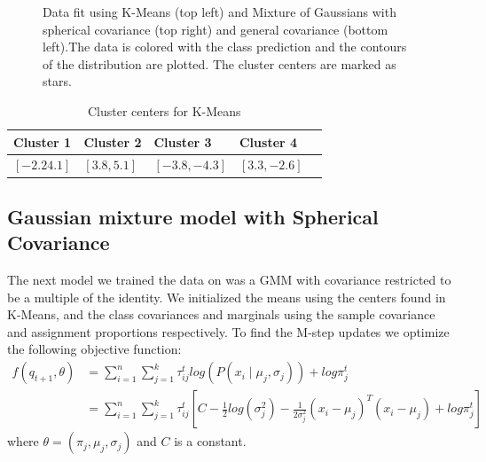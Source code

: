 \documentclass[paper=a4, fontsize=11pt]{scrartcl} %
\numberwithin{equation}{section} %
\numberwithin{figure}{section} %
\numberwithin{table}{section} %
\begin{document}
\begin{figure}
\begin{subfigure}{.5\textwidth}
	\end{subfigure}
	\caption{Data fit using K-Means (top left) and Mixture of Gaussians with spherical covariance (top right) and general covariance (bottom left).The data is colored with the class prediction and the contours of the distribution are plotted. The cluster centers are marked as stars.}
\end{figure}

	\begin{table}
		\caption {Cluster centers for K-Means} \label{tab:title} 
		\begin{center}		
			\begin{tabular}{*5l}   
				\toprule
				Cluster 1 & Cluster 2 & Cluster 3 & Cluster 4
				\\\midrule
				$[-2.2  4.1]$ & $[3.8, 5.1]$ & $[-3.8,-4.3]$ & $[3.3, -2.6]$ \\\bottomrule
				\hline
			\end{tabular}
		\end{center}
	\end{table}

\newpage
	
\subsection{Gaussian mixture model with Spherical Covariance}

The next model we trained the data on was a GMM with covariance restricted to be a multiple of the identity. We initialized the means using the centers found in K-Means, and the class covariances and marginals using the sample covariance and assignment proportions respectively. To find the M-step updates we optimize the following objective function:
\begin{align*}
f(q_{t+1},\theta) &= \sum_{i=1}^{n}\sum_{j=1}^{k}\tau_{ij}^{t}log(P(x_i \mid \mu_j, \sigma_j)) + log\pi_j^t\\
&=  \sum_{i=1}^{n}\sum_{j=1}^{k}\tau_{ij}^{t}\left[ C-\frac{1}{2}log(\sigma_j^2)-\frac{1}{2\sigma_j^2}(x_i-\mu_j)^T(x_i-\mu_j) + log\pi_j^t\right]
\end{align*}
where \(\theta=(\pi_j, \mu_j, \sigma_j)\) and \(C\) is a constant.
\end{document}
